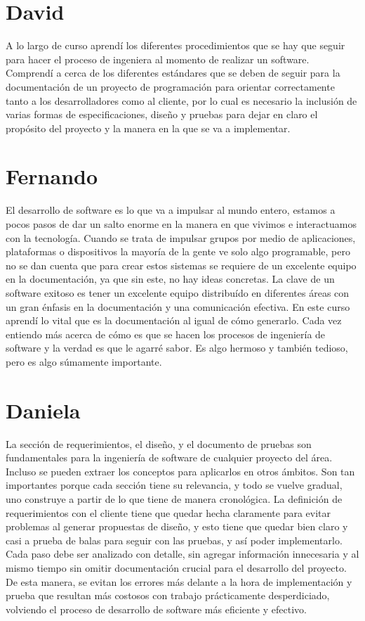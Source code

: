 \documentclass{scrreprt}
\begin{document}
\section{David}
A lo largo de curso aprendí los diferentes procedimientos que se hay que seguir para hacer el proceso de ingeniera al momento de realizar un software. Comprendí a cerca de los diferentes estándares que se deben de 
seguir para la documentación de un proyecto de programación para orientar correctamente tanto a los desarrolladores como al cliente, por lo cual es necesario la inclusión de varias formas de especificaciones, diseño y 
pruebas para dejar en claro el propósito del proyecto y la manera en la que se va a implementar.

\section{Fernando}
El desarrollo de software es lo que va a impulsar al mundo entero, estamos a pocos pasos de dar un salto enorme en la manera en que vivimos e interactuamos con la tecnología. Cuando se trata de impulsar grupos por medio 
de aplicaciones, plataformas o dispositivos la mayoría de la gente ve solo algo programable, pero no se dan cuenta que para crear estos sistemas se requiere de un excelente equipo en la documentación, ya que sin este, 
no hay ideas concretas. La clave de un software exitoso es tener un excelente equipo distribuído en diferentes áreas con un gran énfasis en la documentación y una comunicación efectiva. En este curso aprendí lo vital 
que es la documentación al igual de cómo generarlo. Cada vez entiendo más acerca de cómo es que se hacen los procesos de ingeniería de software y la verdad es que le agarré sabor. Es algo hermoso y también tedioso, pero 
es algo súmamente importante.

\section{Daniela}
La sección de requerimientos, el diseño, y el documento de pruebas son fundamentales para la ingeniería de software de cualquier proyecto del área. Incluso se pueden extraer los conceptos para aplicarlos en otros 
ámbitos. Son tan importantes porque cada sección tiene su relevancia, y todo se vuelve gradual, uno construye a partir de lo que tiene de manera cronológica. La definición de requerimientos con el cliente tiene que 
quedar hecha claramente para evitar problemas al generar propuestas de diseño, y esto tiene que quedar bien claro y casi a prueba de balas para seguir con las pruebas, y así poder implementarlo. Cada paso debe ser 
analizado con detalle, sin agregar información innecesaria y al mismo tiempo sin omitir documentación crucial para el desarrollo del proyecto. De esta manera, se evitan los errores más delante a la hora de 
implementación y prueba que resultan más costosos con trabajo prácticamente desperdiciado, volviendo el proceso de desarrollo de software más eficiente y efectivo.
\end{document}
